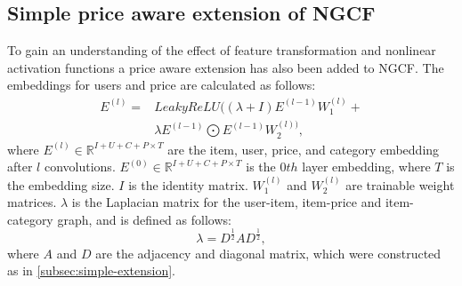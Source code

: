 \subsection{Simple price aware extension of NGCF}
To gain an understanding of the effect of feature transformation and nonlinear activation functions a price aware extension has also been added to NGCF.
The embeddings for users and price are calculated as follows:
\begin{equation}
    \begin{split}
        E^{(l)} = &LeakyReLU((\lambda + I)E^{(l-1)}W_1^{(l)}+\\
        & \lambda E^{(l-1)}\bigodot E^{(l-1)}W_2^{(l))},
    \end{split}
\end{equation}
where $E^{(l)} \in \mathbb{R}^{I+U+C+P \times T}$ are the item, user, price, and category embedding after $l$ convolutions.
$E^{(0)} \in \mathbb{R}^{I+U+C+P \times T}$ is the $0th$ layer embedding, where $T$ is the embedding size.
$I$ is the identity matrix.
$W_1^{(l)}$ and $W_2^{(l)}$ are trainable weight matrices.
$\lambda$ is the Laplacian matrix for the user-item, item-price and item-category graph, and is defined as follows:
\begin{equation}
    \lambda = D^{\frac{1}{2}}AD^{\frac{1}{2}},
\end{equation}
where $A$ and $D$ are the adjacency and diagonal matrix, which were constructed as in \autoref{subsec:simple-extension}.